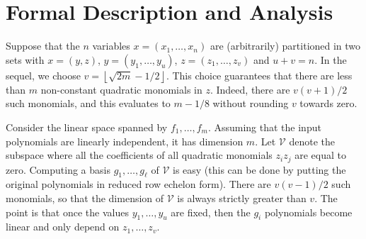 \documentclass[a4paper,UKenglish,cleveref, autoref]{lipics-v2019}
\begin{document}
\section{Formal Description and Analysis}







Suppose that the $n$ variables $x = (x_1, \dots, x_n)$ are (arbitrarily)
partitioned in two sets with $x = (y, z)$, $y = (y_1, \dots, y_{u})$,
$z = (z_1, \dots, z_{v})$ and $u + v = n$. In the sequel, we choose
$v = \left\lfloor \sqrt{2m} - 1/2 \right\rfloor$. This choice guarantees that
there are less than $m$ non-constant quadratic monomials in $z$. Indeed, there
are $v(v+1)/2$ such monomials, and this evaluates to $m - 1/8$ without
rounding $v$ towards zero.


Consider the linear space spanned by $f_1, \dots, f_m$. Assuming that the input
polynomials are linearly independent, it has dimension $m$.  Let $\mathcal{V}$
denote the subspace where all the coefficients of all quadratic monomials
$z_i z_j$ are equal to zero. Computing a basis $g_1, \dots, g_\ell$ of
$\mathcal{V}$ is easy (this can be done by putting the original polynomials in
reduced row echelon form). There are $v(v-1) / 2$ such monomials, so that the
dimension of $\mathcal{V}$ is always strictly greater than $v$. The point is
that once the values $y_1, \dots, y_u$ are fixed, then the $g_i$ polynomials
become linear and only depend on $z_1, \dots, z_v$.
\end{document}
